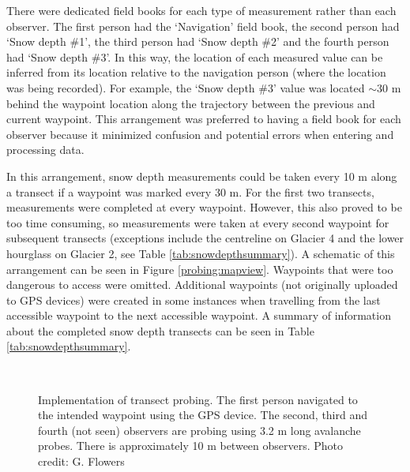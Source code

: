 \documentclass{sfuthesis}
\begin{document}
There were dedicated field books for each type of measurement rather than each observer. The first person had the `Navigation' field book, the second person had `Snow depth \#1', the third person had `Snow depth \#2' and the fourth person had `Snow depth \#3'. In this way, the location of each measured value can be inferred from its location relative to the navigation person (where the location was being recorded). For example, the `Snow depth \#3' value was located $\sim$30 m behind the waypoint location along the trajectory between the previous and current waypoint. This arrangement was preferred to having a field book for each observer because it minimized confusion and potential errors when entering and processing data.

In this arrangement, snow depth measurements could be taken every 10 m along a transect if a waypoint was marked every 30 m. For the first two transects, measurements were completed at every waypoint. However, this also proved to be too time consuming, so measurements were taken at every second waypoint for subsequent transects (exceptions include the centreline on Glacier 4 and the lower hourglass on Glacier 2, see Table \ref{tab:snowdepthsummary}). A schematic of this arrangement can be seen in Figure \ref{probing:mapview}. Waypoints that were too dangerous to access were omitted. Additional waypoints (not originally uploaded to GPS devices) were created in some instances when travelling from the last accessible waypoint to the next accessible waypoint. A summary of information about the completed snow depth transects can be seen in Table \ref{tab:snowdepthsummary}.

\begin{figure}[H]
	\centering
	\\
	\caption[Implementation of transect probing]{Implementation of transect probing. The first person navigated to the intended waypoint using the GPS device. The second, third and fourth (not seen) observers are probing using 3.2 m long avalanche probes. There is approximately 10 m between observers. Photo credit: G. Flowers}
	\label{photo_probing}
	\end{figure}
\end{document}
